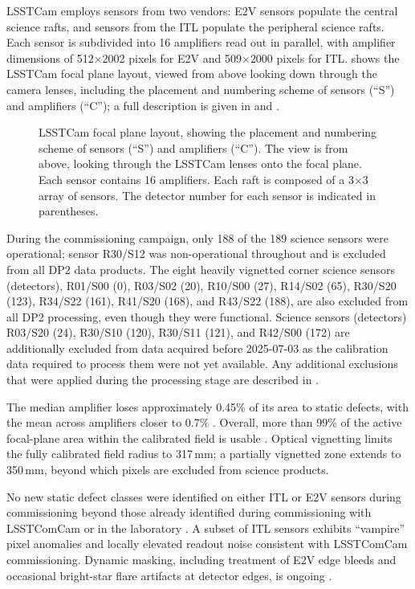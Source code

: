 \gls{LSSTCam} employs sensors from two vendors: \gls{E2V} sensors populate the central science rafts, and sensors from the \gls{ITL} populate the peripheral science rafts.
Each sensor is subdivided into 16 amplifiers read out in parallel, with amplifier dimensions of 512$\times$2002 pixels for \gls{E2V} and 509$\times$2000 pixels for \gls{ITL}.
 shows the \gls{LSSTCam} focal plane layout, viewed from above looking down through the camera lenses, including the placement and numbering scheme of sensors (``S'') and amplifiers (``C''); a full description is given in \citet[][]{2025JATIS..11a1209P} and \citet[][]{ctn-001}.
\begin{figure}[htb!]
\caption{\gls{LSSTCam} focal plane layout, showing the placement and numbering scheme of sensors (``S'') and amplifiers (``C''). The view is from above, looking through the \gls{LSSTCam} lenses onto the focal plane. Each sensor contains 16 amplifiers. Each raft is composed of a 3$\xspace\times\xspace$3 array of sensors. The detector number for each sensor is indicated in parentheses.}
\label{fig:lsstcam_schematic}
\end{figure}

During the commissioning campaign, only 188 of the 189 science sensors were operational; sensor R30/S12 was non-operational throughout and is excluded from all \gls{DP2} data products.
The eight heavily vignetted corner science sensors (detectors), R01/S00 (0), R03/S02 (20), R10/S00 (27), R14/S02 (65), R30/S20 (123), R34/S22 (161), R41/S20 (168), and R43/S22 (188), are also excluded from all \gls{DP2} processing, even though they were functional.
Science sensors (detectors) R03/S20 (24), R30/S10 (120), R30/S11 (121), and R42/S00 (172) are additionally excluded from data acquired before 2025-07-03 as the \gls{calibration} data required to process them were not yet available.
Any additional exclusions that were applied during the processing stage are described in .

The median amplifier loses approximately 0.45\% of its area to static defects, with the mean across amplifiers closer to 0.7\%  \citep[][]{SITCOMTN-170}.
Overall, more than 99\% of the active focal-plane area within the calibrated field is usable \citep[][]{SITCOMTN-170}.
Optical vignetting limits the fully calibrated field radius to 317\,mm; a partially vignetted zone extends to 350\,mm, beyond which pixels are excluded from science products.

No new static defect classes were identified on either \gls{ITL} or \gls{E2V} sensors during commissioning beyond those already identified during commissioning with \gls{LSSTComCam} \citep[][]{rtn-095} or in the laboratory \citep[][]{SITCOMTN-148, SITCOMTN-170}.
A subset of \gls{ITL} sensors exhibits ``vampire'' pixel anomalies and locally elevated readout noise consistent with \gls{LSSTComCam} commissioning.
Dynamic masking, including treatment of \gls{E2V} edge bleeds and occasional bright-star flare artifacts at detector edges, is ongoing \citep[][]{SITCOMTN-170}.



